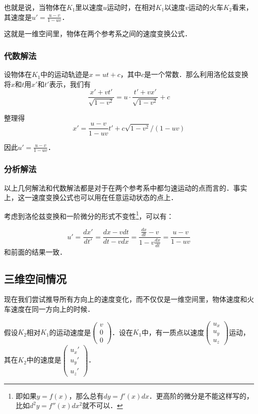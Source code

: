 也就是说，当物体在$K_1$里以速度$u$运动时，在相对$K_1$以速度$v$运动的火车$K_2$看来，其速度是$u'=\frac{u-v}{1-uv}$．

这就是一维空间里，物体在两个参考系之间的速度变换公式．

\subsubsection{代数解法}

设物体在$K_1$中的运动轨迹是$x=ut+c$，其中$c$是一个常数．那么利用洛伦兹变换将$x$和$t$用$x'$和$t'$表示，我们有$$\frac{x'+vt'}{\sqrt{1-v^2}}=u\cdot\frac{t'+vx'}{\sqrt{1-v^2}}+c$$

整理得$$x'=\frac{u-v}{1-uv}t'+c\sqrt{1-v^2}/(1-uv)$$

因此$u'=\frac{u-v}{1-uv}$．

\subsubsection{分析解法}

以上几何解法和代数解法都是对于在两个参考系中都匀速运动的点而言的．事实上，这一速度变换公式也可以用在任意运动状态的点上．

考虑到洛伦兹变换和一阶微分的形式不变性\footnote{即如果$y=f(x)$，那么总有$dy=f'(x)dx$．更高阶的微分是不能这样写的，比如$d^2y=f''(x)dx^2$就不可以．}，可以有：

$$u'=\frac{dx'}{dt'}=\frac{dx-vdt}{dt-vdx}=\frac{\frac{dx}{dt}-v}{1-v\frac{dx}{dt}}=\frac{u-v}{1-uv}$$和前面的结果一致．


\subsection{三维空间情况}

现在我们尝试推导所有方向上的速度变化，而不仅仅是一维空间里，物体速度和火车速度在同一方向上的时候．

假设$K_2$相对$K_1$的运动速度是$\left(\begin{matrix}v\\0\\0\end{matrix} \right) \tag{2}$．设在$K_1$中，有一质点以速度$\left(\begin{matrix}u_x\\u_y\\u_z\end{matrix} \right) \tag{2}$运动，其在$K_2$中的速度是$\left(\begin{matrix}u_x'\\u_y'\\u_z'\end{matrix} \right) \tag{2}$．

